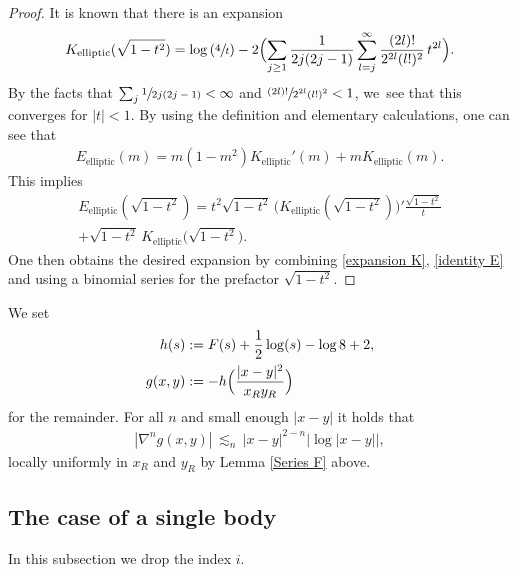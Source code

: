 \documentclass[JEP,XML,SOM,Unicode,published]{cedram}
\theoremstyle{definition}
\newcommand\eq{=}
\begin{document}
\begin{proof}
It is known \cite[p.\,53]{schwarz1893formeln} that there is an expansion
\begin{align}
K_\mathrm{elliptic}(\sqrt{1-t^2})\eq\log\left(\sfrac{4}{t}\right)-2\Bigl(\sum_{j\geq 1}\frac{1}{2j(2j-1)}\sum_{l=j}^\infty \frac{(2l)!}{2^{2l}(l!)^2}\,t^{2l}\Bigr).\label{expansion K}
\end{align}
By the facts that $\sum_j\sfrac{1}{2j(2j-1)}<\infty$ and $\sfrac{(2l)!}{2^{2l}(l!)^2}<1$, we~see that this converges for $|t|<1$.
By using the definition and elementary calculations, one can see that
\begin{align*}
E_\mathrm{elliptic}(m)\eq m(1-m^2)K_\mathrm{elliptic}'(m)+mK_\mathrm{elliptic}(m).
\end{align*}
This implies
\begin{multline}
E_\mathrm{elliptic}(\sqrt{1-t^2})\eq t^2\sqrt{1-t^2}\,\bigl(K_\mathrm{elliptic}(\sqrt{1-t^2})\bigr)'\frac{\sqrt{1-t^2}}{t}\\
+\sqrt{1-t^2}\,K_\mathrm{elliptic}\bigl(\sqrt{1-t^2}\bigr).\label{identity E}
\end{multline}
One then obtains the desired expansion by combining \eqref{expansion K}, \eqref{identity E} and using a binomial series for the prefactor $\sqrt{1-t^2}$.\end{proof}

We set
\begin{align*}
h(s)&:=F(s)+\frac{1}{2}\log(s)-\log 8+2,\\
g(x,y)&:=- h\Bigl(\frac{|x-y|^2}{x_Ry_R}\Bigr)
\end{align*}
for the remainder. For all $n$ and small enough $|x-y|$ it holds that
\begin{align}\label{est g}
|\nabla^ng(x,y)|\,\lesssim_n\, |x-y|^{2-n}\bigl|{\log|x-y|}\bigr|,
\end{align}
locally uniformly in $x_R$ and $y_R$ by Lemma \ref{Series F} above.

\subsection{The case of a single body}
In this subsection we drop the index $i$.
\end{document}
